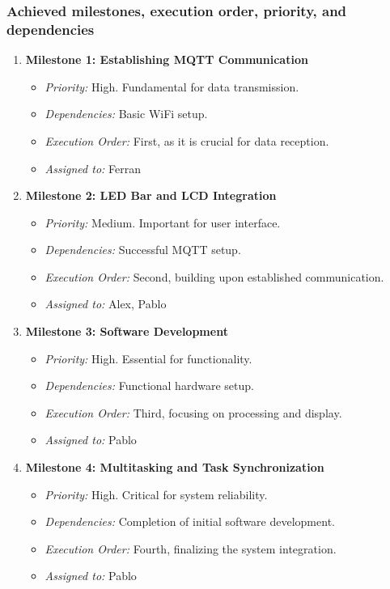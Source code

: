 \subsubsection{Achieved milestones, execution order, priority, and dependencies}
\begin{enumerate}
    \item \textbf{Milestone 1: Establishing MQTT Communication}
        \begin{itemize}
            \item \textit{Priority:} High. Fundamental for data transmission.
            \item \textit{Dependencies:} Basic WiFi setup.
            \item \textit{Execution Order:} First, as it is crucial for data reception.
            \item \textit{Assigned to:} Ferran
        \end{itemize}

    \item \textbf{Milestone 2: LED Bar and LCD Integration}
        \begin{itemize}
            \item \textit{Priority:} Medium. Important for user interface.
            \item \textit{Dependencies:} Successful MQTT setup.
            \item \textit{Execution Order:} Second, building upon established communication.
            \item \textit{Assigned to:} Alex, Pablo
        \end{itemize}

    \item \textbf{Milestone 3: Software Development}
        \begin{itemize}
            \item \textit{Priority:} High. Essential for functionality.
            \item \textit{Dependencies:} Functional hardware setup.
            \item \textit{Execution Order:} Third, focusing on processing and display.
            \item \textit{Assigned to:} Pablo
        \end{itemize}

    \item \textbf{Milestone 4: Multitasking and Task Synchronization}
        \begin{itemize}
            \item \textit{Priority:} High. Critical for system reliability.
            \item \textit{Dependencies:} Completion of initial software development.
            \item \textit{Execution Order:} Fourth, finalizing the system integration.
            \item \textit{Assigned to:} Pablo
        \end{itemize}
\end{enumerate}

